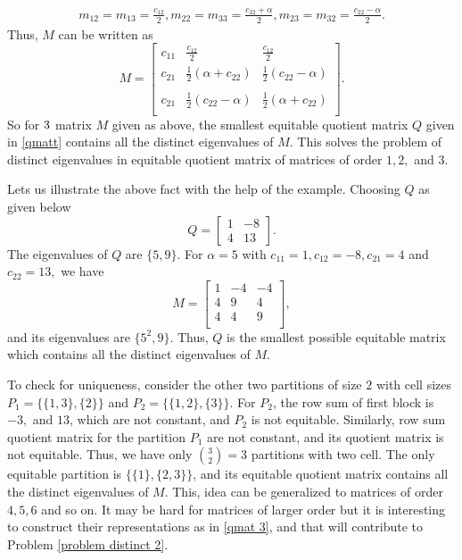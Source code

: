 \documentclass[12pt,twoside]{article}
\begin{document}
\begin{align*}
	m_{12}=m_{13}=\frac{c_{12}}{2}, m_{22}=m_{33}=\frac{c_{22}+\alpha}{2}, m_{23}=m_{32}=\frac{c_{22}-\alpha}{2}.
\end{align*}
Thus, $M$ can be written as 
\begin{equation}\label{qmat 3}
	M=\left[
\begin{array}{ccc}
	c_{11} & \frac{c_{12}}{2} & \frac{c_{12}}{2} \\
	c_{21} & \frac{1}{2} \left(\alpha+c_{22}\right) & \frac{1}{2} \left(c_{22}-\alpha\right) \\~\\
	c_{21} & \frac{1}{2} \left(c_{22}-\alpha\right) & \frac{1}{2} \left(\alpha+c_{22}\right) \\
\end{array}
\right].
\end{equation}
So for $3\time 3$ matrix $M$ given as above, the smallest equitable quotient matrix $Q$ given in \eqref{qmatt} contains all the distinct eigenvalues of $M.$ This solves the problem of distinct eigenvalues in equitable quotient matrix of matrices of order $1,2,$ and $3.$

Lets us illustrate the above fact with the help of the example. Choosing $Q$ as given below
$$ Q = \begin{bmatrix} 1 & -8 \\ 4 & 13 \end{bmatrix} .$$
The eigenvalues of $Q$ are $\{5,9\}$. For $\alpha=5$ with $c_{11}=1,c_{12}=-8,c_{21}=4$ and $c_{22}=13,$ we have
$$M=\left[
\begin{array}{ccc}
	1 & -4 & -4 \\
	4 & 9 & 4 \\
	4 & 4 & 9 \\
\end{array}
\right],$$
and its eigenvalues are $\{5^{2},9\}$. Thus, $Q$ is the smallest possible equitable matrix which contains all the distinct eigenvalues of $M.$

To check for uniqueness, consider the other two partitions of size $2$ with cell sizes $P_{1}=\{\{1,3\},\{2\}\}$ and $P_{2}=\{ \{1,2\},\{3\}\}$.
For $P_{2}$, the row sum of first block is $-3, $ and $13$, which are not constant, and $P_{2}$ is not equitable. Similarly, row sum quotient matrix for the partition $P_{1}$ are not constant, and its quotient matrix  is not equitable. Thus, we have only $\binom{3}{2}=3$ partitions with two cell. The only equitable partition is $\{\{1\},\{2,3\}\}$, and its equitable quotient matrix contains all the distinct eigenvalues of $M.$ This, idea can be generalized to matrices of order $4, 5,6$ and so on. It may be hard for matrices of larger order but it is interesting to construct their representations as in \eqref{qmat 3}, and that will contribute to Problem \ref{problem distinct 2}.
\end{document}
